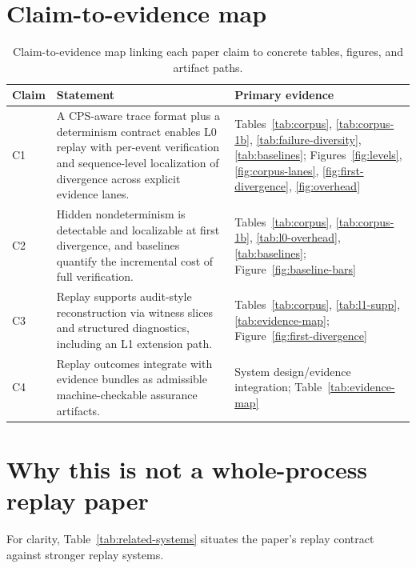 \documentclass[11pt]{article}
\newcommand{\Lzero}{\ensuremath{\mathrm{L0}}}
\begin{document}
\section{Claim-to-evidence map}

\begin{table}[H]
\centering
\caption{Claim-to-evidence map linking each paper claim to concrete tables, figures, and artifact paths.}
\label{tab:claim-map}
\begin{tabular}{p{1.2cm}p{9.5cm}p{3.1cm}}
\toprule
Claim & Statement & Primary evidence \\
\midrule
C1 & A CPS-aware trace format plus a determinism contract enables \Lzero{} replay with per-event verification and sequence-level localization of divergence across explicit evidence lanes. & Tables~\ref{tab:corpus}, \ref{tab:corpus-1b}, \ref{tab:failure-diversity}, \ref{tab:baselines}; Figures~\ref{fig:levels}, \ref{fig:corpus-lanes}, \ref{fig:first-divergence}, \ref{fig:overhead} \\
C2 & Hidden nondeterminism is detectable and localizable at first divergence, and baselines quantify the incremental cost of full verification. & Tables~\ref{tab:corpus}, \ref{tab:corpus-1b}, \ref{tab:l0-overhead}, \ref{tab:baselines}; Figure~\ref{fig:baseline-bars} \\
C3 & Replay supports audit-style reconstruction via witness slices and structured diagnostics, including an L1 extension path. & Tables~\ref{tab:corpus}, \ref{tab:l1-supp}, \ref{tab:evidence-map}; Figure~\ref{fig:first-divergence} \\
C4 & Replay outcomes integrate with evidence bundles as admissible machine-checkable assurance artifacts. & System design/evidence integration; Table~\ref{tab:evidence-map} \\
\bottomrule
\end{tabular}
\end{table}

\section{Why this is not a whole-process replay paper}

For clarity, Table~\ref{tab:related-systems} situates the paper's replay contract against stronger replay systems.
\end{document}

